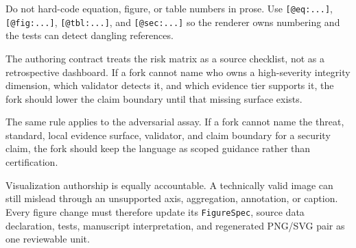 \documentclass[
  english,
]{article}
\begin{document}
Do not hard-code equation, figure, or table numbers in prose. Use
\texttt{{[}@eq:...{]}}, \texttt{{[}@fig:...{]}},
\texttt{{[}@tbl:...{]}}, and \texttt{{[}@sec:...{]}} so the renderer
owns numbering and the tests can detect dangling references.

The authoring contract treats the risk matrix as a source checklist, not
as a retrospective dashboard. If a fork cannot name who owns a
high-severity integrity dimension, which validator detects it, and which
evidence tier supports it, the fork should lower the claim boundary
until that missing surface exists.

The same rule applies to the adversarial assay. If a fork cannot name
the threat, standard, local evidence surface, validator, and claim
boundary for a security claim, the fork should keep the language as
scoped guidance rather than certification.

Visualization authorship is equally accountable. A technically valid
image can still mislead through an unsupported axis, aggregation,
annotation, or caption. Every figure change must therefore update its
\texttt{FigureSpec}, source data declaration, tests, manuscript
interpretation, and regenerated PNG/SVG pair as one reviewable unit.



\clearpage


\end{document}
